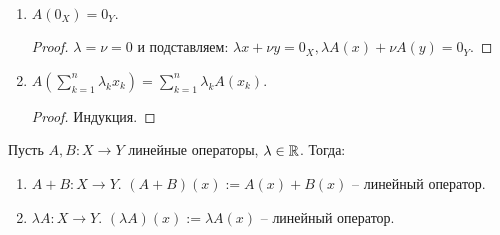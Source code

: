 \begin{statement}~
    \begin{enumerate}
        \item $A(0_X)=0_Y$.
        \begin{proof}
            $\lambda=\nu=0$ и подставляем: $\lambda x+\nu y=0_X, \lambda A(x)+\nu A(y)=0_Y$.
        \end{proof}
        \item $A(\sum\limits_{k=1}^n\lambda_k x_k)=\sum\limits_{k=1}^n\lambda_k A(x_k)$.
        \begin{proof} Индукция.
        \end{proof}
    \end{enumerate}
\end{statement}

\begin{definition}
    Пусть $A, B:X\rightarrow Y$ линейные операторы, $\lambda\in \mathbb{R}$. Тогда:
    \begin{enumerate}
        \item $A+B:X\rightarrow Y$. $(A+B)(x):=A(x)+B(x)$ – линейный оператор.
        \item $\lambda A:X\rightarrow Y$. $(\lambda A)(x):=\lambda A(x)$  – линейный оператор.
    \end{enumerate}
\end{definition}

